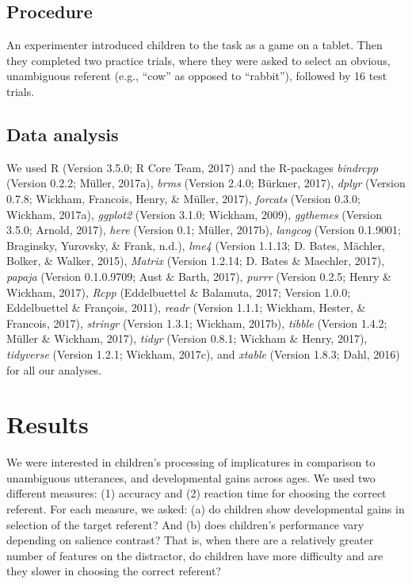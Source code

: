 \documentclass[man]{apa6}
\begin{document}
\subsection{Procedure}\label{procedure}

An experimenter introduced children to the task as a game on a tablet.
Then they completed two practice trials, where they were asked to select
an obvious, unambiguous referent (e.g., \enquote{cow} as opposed to
\enquote{rabbit}), followed by 16 test trials.

\subsection{Data analysis}\label{data-analysis}

We used R (Version 3.5.0; R Core Team, 2017) and the R-packages
\emph{bindrcpp} (Version 0.2.2; Müller, 2017a), \emph{brms} (Version
2.4.0; Bürkner, 2017), \emph{dplyr} (Version 0.7.8; Wickham, Francois,
Henry, \& Müller, 2017), \emph{forcats} (Version 0.3.0; Wickham, 2017a),
\emph{ggplot2} (Version 3.1.0; Wickham, 2009), \emph{ggthemes} (Version
3.5.0; Arnold, 2017), \emph{here} (Version 0.1; Müller, 2017b),
\emph{langcog} (Version 0.1.9001; Braginsky, Yurovsky, \& Frank, n.d.),
\emph{lme4} (Version 1.1.13; D. Bates, Mächler, Bolker, \& Walker,
2015), \emph{Matrix} (Version 1.2.14; D. Bates \& Maechler, 2017),
\emph{papaja} (Version 0.1.0.9709; Aust \& Barth, 2017), \emph{purrr}
(Version 0.2.5; Henry \& Wickham, 2017), \emph{Rcpp} (Eddelbuettel \&
Balamuta, 2017; Version 1.0.0; Eddelbuettel \& François, 2011),
\emph{readr} (Version 1.1.1; Wickham, Hester, \& Francois, 2017),
\emph{stringr} (Version 1.3.1; Wickham, 2017b), \emph{tibble} (Version
1.4.2; Müller \& Wickham, 2017), \emph{tidyr} (Version 0.8.1; Wickham \&
Henry, 2017), \emph{tidyverse} (Version 1.2.1; Wickham, 2017c), and
\emph{xtable} (Version 1.8.3; Dahl, 2016) for all our analyses.

\section{Results}\label{results}

We were interested in children's processing of implicatures in
comparison to unambiguous utterances, and developmental gains across
ages. We used two different measures: (1) accuracy and (2) reaction time
for choosing the correct referent. For each measure, we asked: (a) do
children show developmental gains in selection of the target referent?
And (b) does children's performance vary depending on salience contrast?
That is, when there are a relatively greater number of features on the
distractor, do children have more difficulty and are they slower in
choosing the correct referent?
\end{document}
